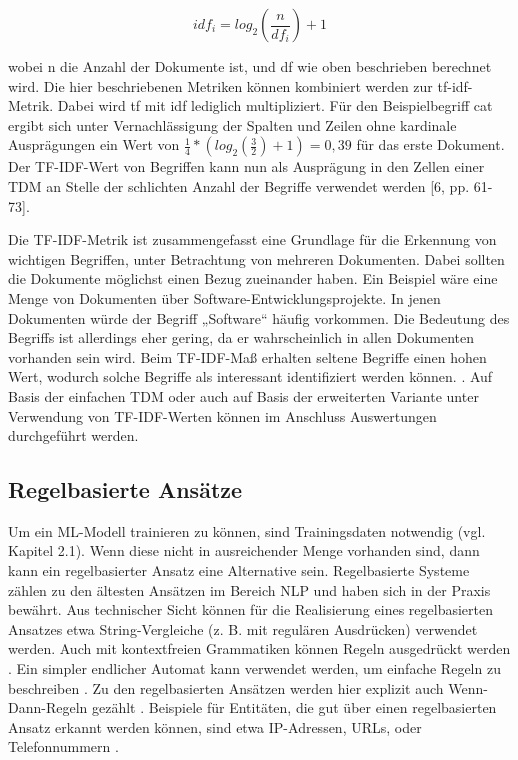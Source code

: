 \[ idf_i = log_2( \frac{n}{df_i}) + 1 \]

wobei n die Anzahl der Dokumente ist, und df wie oben beschrieben berechnet wird. Die hier beschriebenen Metriken können kombiniert werden zur tf-idf-Metrik. Dabei wird tf mit idf lediglich multipliziert. Für den Beispielbegriff cat ergibt sich unter Vernachlässigung der Spalten und Zeilen ohne kardinale Ausprägungen ein Wert von \( \frac{1}{4} * (log_2( \frac{3}{2} )+1)=0,39 \) 
für das erste Dokument. Der TF-IDF-Wert von Begriffen kann nun als Ausprägung in den Zellen einer TDM an Stelle der schlichten Anzahl der Begriffe verwendet werden [6, pp. 61-73].

Die TF-IDF-Metrik ist zusammengefasst eine Grundlage für die Erkennung von wichtigen Begriffen, unter Betrachtung von mehreren Dokumenten. Dabei sollten die Dokumente möglichst einen Bezug zueinander haben. Ein Beispiel wäre eine Menge von Dokumenten über Software-Entwicklungsprojekte. In jenen Dokumenten würde der Begriff „Software“ häufig vorkommen. Die Bedeutung des Begriffs ist allerdings eher gering, da er wahrscheinlich in allen Dokumenten vorhanden sein wird. Beim TF-IDF-Maß erhalten seltene Begriffe einen hohen Wert, wodurch solche Begriffe als interessant identifiziert werden können. \cite[S. 107-110]{Manning}. Auf Basis der einfachen TDM oder auch auf Basis der erweiterten Variante unter Verwendung von TF-IDF-Werten können im Anschluss Auswertungen durchgeführt werden.

\subsection{Regelbasierte Ansätze}

Um ein ML-Modell trainieren zu können, sind Trainingsdaten notwendig (vgl. Kapitel 2.1). Wenn diese nicht in ausreichender Menge vorhanden sind, dann kann ein regelbasierter Ansatz eine Alternative sein. Regelbasierte Systeme zählen zu den ältesten Ansätzen im Bereich NLP und haben sich in der Praxis bewährt. Aus technischer Sicht können für die Realisierung eines regelbasierten Ansatzes etwa String-Vergleiche (z. B. mit regulären Ausdrücken) verwendet werden. Auch mit kontextfreien Grammatiken können Regeln ausgedrückt werden \cite{kaggle}. Ein simpler endlicher Automat kann verwendet werden, um einfache Regeln zu beschreiben \cite[S. 219]{Manning}. Zu den regelbasierten Ansätzen werden hier explizit auch Wenn-Dann-Regeln gezählt \cite[S. 23ff.]{Ertel}. Beispiele für Entitäten, die gut über einen regelbasierten Ansatz erkannt werden können, sind etwa IP-Adressen, URLs, oder Telefonnummern \cite{spacy}.

